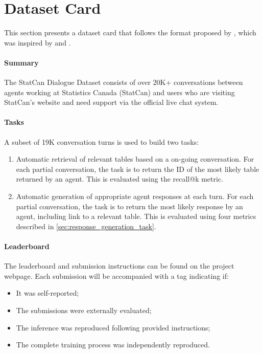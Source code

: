 \documentclass[11pt]{article}
\begin{document}
\newpage

\section{Dataset Card}
\label{sec:appendix_dataset_card}

This section presents a dataset card that follows the format proposed by \citet{lhoest2021datasets}, which was inspired by \citet{mitchell_model_2019} and \citet{Gebru2021DatasheetsFD}.

\paragraph{Summary} The StatCan Dialogue Dataset consists of over 20K+ conversations between agents working at Statistics Canada (StatCan) and users who are visiting StatCan's website and need support via the official live chat system. 

\paragraph{Tasks} A subset of 19K conversation turns is used to build two tasks:

\begin{enumerate}
    \item Automatic retrieval of relevant tables based on a on-going conversation. For each partial conversation, the task is to return the ID of the most likely table returned by an agent. This is evaluated using the recall@k metric.
    \item Automatic generation of appropriate agent responses at each turn. For each partial conversation, the task is to return the most likely response by an agent, including link to a relevant table. This is evaluated using four metrics described in \autoref{sec:response_generation_task}.
\end{enumerate}

\paragraph{Leaderboard} The leaderboard and submission instructions can be found on the project webpage. Each submission will be accompanied with a tag indicating if:
\begin{itemize}
    \item It was self-reported;
    \item The submissions were externally evaluated;
    \item The inference was reproduced following provided instructions;
    \item The complete training process was independently reproduced.
\end{itemize}
\end{document}
